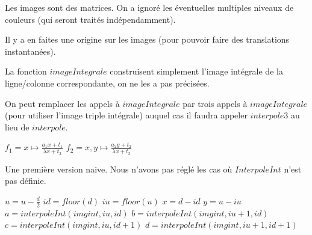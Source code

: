 


Les images sont des matrices. On a ignoré les éventuelles multiples niveaux de couleurs (qui seront traités indépendamment).

Il y a en faites une origine sur les images (pour pouvoir faire des translations instantanées).

\medbreak
La fonction $imageIntegrale$ construisent simplement l'image intégrale de la ligne/colonne correspondante, on ne les a pas précisées.

On peut remplacer les appels à $imageIntegrale$ par trois appels à $imageIntegrale$ (pour utiliser l'image triple intégrale) auquel cas il faudra appeler $interpole3$ au lieu de $interpole$.


\begin{algorithm}
\caption{$applyHomography(img,imgf,H)$}
$f_1 = x\mapsto \frac{a_1x + t_1}{\lambda x + t_3}$ \;
$f_2 = x,y\mapsto \frac{a_2y + t_2}{\lambda x + t_3}$ \;
\end{algorithm}


Une première version naive. Nous n'avons pas réglé les cas où $InterpoleInt$ n'est pas définie.

\begin{algorithm}
\caption{$interpole(imgint,u,d)$}
$u=u-\frac{d}{2}$\;
$id=floor(d)$\;
$iu=floor(u)$\;
$x = d-id$\;
$y = u-iu$\;
$a=interpoleInt(imgint,iu,id)$\;
$b=interpoleInt(imgint,iu+1,id)$\;
$c=interpoleInt(imgint,iu,id+1)$\;
$d=interpoleInt(imgint,iu+1,id+1)$\;
\end{algorithm}

